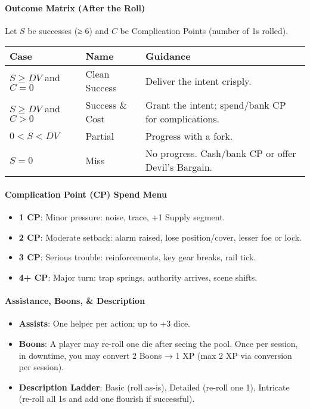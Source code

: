 \documentclass[11pt]{article}
\begin{document}
\paragraph{Outcome Matrix (After the Roll)}
Let $S$ be successes (≥ 6) and $C$ be Complication Points (number of 1s rolled).
\begin{center}
\begin{tabular}{lll}
\toprule
\textbf{Case} & \textbf{Name} & \textbf{Guidance} \\
\midrule
$S \geq DV$ and $C = 0$ & Clean Success & Deliver the intent crisply. \\
$S \geq DV$ and $C > 0$ & Success \& Cost & Grant the intent; spend/bank CP for complications. \\
$0 < S < DV$ & Partial & Progress with a fork. \\
$S = 0$ & Miss & No progress. Cash/bank CP or offer Devil's Bargain. \\
\bottomrule
\end{tabular}
\end{center}

\paragraph{Complication Point (CP) Spend Menu}
\begin{itemize}
    \item \textbf{1 CP}: Minor pressure: noise, trace, +1 Supply segment.
    \item \textbf{2 CP}: Moderate setback: alarm raised, lose position/cover, lesser foe or lock.
    \item \textbf{3 CP}: Serious trouble: reinforcements, key gear breaks, rail tick.
    \item \textbf{4+ CP}: Major turn: trap springs, authority arrives, scene shifts.
\end{itemize}

\paragraph{Assistance, Boons, \& Description}
\begin{itemize}
    \item \textbf{Assists}: One helper per action; up to +3 dice.
    \item \textbf{Boons}: A player may re-roll one die after seeing the pool. Once per session, in downtime, you may convert 2 Boons → 1 XP (max 2 XP via conversion per session).
    \item \textbf{Description Ladder}: Basic (roll as-is), Detailed (re-roll one 1), Intricate (re-roll all 1s and add one flourish if successful).
\end{itemize}
\end{document}
